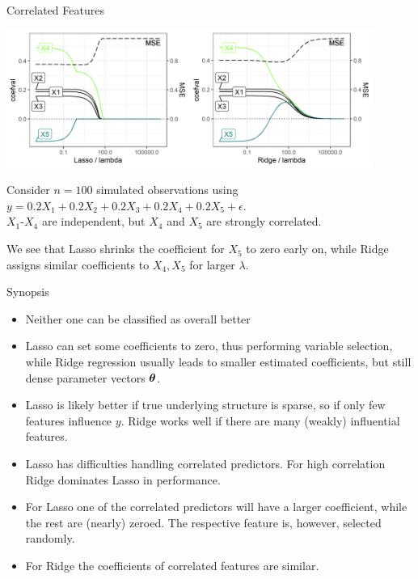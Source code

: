 \documentclass[11pt,compress,t,notes=noshow, xcolor=table]{beamer}
\begin{document}
\begin{vbframe}{Correlated Features}


\includegraphics[width=0.9\textwidth]{figure/regu_example_multicollinearity.png}

Consider $n=100$ simulated observations using $y = 0.2X_1 + 0.2X_2 + 0.2X_3 + 0.2X_4 + 0.2X_5 + \epsilon$.\\
$X_1$-$X_4$ are independent, but $X_4$ and $X_5$ are strongly correlated.

\vspace{0.1cm}

We see that Lasso shrinks the coefficient for $X_5$ to zero early on, while Ridge assigns similar coefficients to $X_4, X_5$ for larger $\lambda$.

\end{vbframe}


\begin{vbframe}{Synopsis  }

\begin{itemize}
\item Neither one can be classified as overall better
\item Lasso can set some coefficients to zero, thus performing variable selection, while Ridge regression usually leads to smaller estimated coefficients, but still dense parameter vectors $\bm{\theta}$.
\item Lasso is likely better if true underlying structure is sparse, so if only few features influence $y$. Ridge works well if there are many (weakly) influential features.
\item Lasso has difficulties handling correlated predictors. For high correlation Ridge dominates Lasso in performance.
\item For Lasso one of the correlated predictors will have a larger coefficient, while the rest are (nearly) zeroed. The respective feature is, however, selected randomly. 
\item For Ridge the coefficients of correlated features are similar.
\end{itemize}

\end{vbframe}

\endlecture
\end{document}
